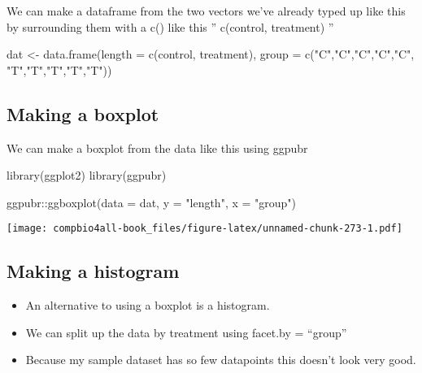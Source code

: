 \documentclass[
]{book}
\newenvironment{Shaded}{\begin{snugshade}}{\end{snugshade}}
\newcommand{\AttributeTok}[1]{\textcolor[rgb]{0.77,0.63,0.00}{#1}}
\newcommand{\FunctionTok}[1]{\textcolor[rgb]{0.00,0.00,0.00}{#1}}
\newcommand{\NormalTok}[1]{#1}
\newcommand{\OtherTok}[1]{\textcolor[rgb]{0.56,0.35,0.01}{#1}}
\newcommand{\SpecialCharTok}[1]{\textcolor[rgb]{0.00,0.00,0.00}{#1}}
\newcommand{\StringTok}[1]{\textcolor[rgb]{0.31,0.60,0.02}{#1}}
\providecommand{\tightlist}{%
  \setlength{\itemsep}{0pt}\setlength{\parskip}{0pt}}
\begin{document}
We can make a dataframe from the two vectors we've already typed up like this by surrounding them with a c() like this '' c(control, treatment) ''

\begin{Shaded}
\begin{Highlighting}[]
\NormalTok{dat }\OtherTok{\textless{}{-}} \FunctionTok{data.frame}\NormalTok{(}\AttributeTok{length =} \FunctionTok{c}\NormalTok{(control, }
\NormalTok{                             treatment),}
                  \AttributeTok{group =} \FunctionTok{c}\NormalTok{(}\StringTok{"C"}\NormalTok{,}\StringTok{"C"}\NormalTok{,}\StringTok{"C"}\NormalTok{,}\StringTok{"C"}\NormalTok{,}\StringTok{"C"}\NormalTok{,}
                            \StringTok{"T"}\NormalTok{,}\StringTok{"T"}\NormalTok{,}\StringTok{"T"}\NormalTok{,}\StringTok{"T"}\NormalTok{,}\StringTok{"T"}\NormalTok{))}
\end{Highlighting}
\end{Shaded}

\hypertarget{making-a-boxplot}{%
\subsection{Making a boxplot}\label{making-a-boxplot}}

We can make a boxplot from the data like this using ggpubr

\begin{Shaded}
\begin{Highlighting}[]
\FunctionTok{library}\NormalTok{(ggplot2)}
\FunctionTok{library}\NormalTok{(ggpubr)}

\NormalTok{ggpubr}\SpecialCharTok{::}\FunctionTok{ggboxplot}\NormalTok{(}\AttributeTok{data =}\NormalTok{ dat,}
          \AttributeTok{y =} \StringTok{"length"}\NormalTok{,}
          \AttributeTok{x =} \StringTok{"group"}\NormalTok{)}
\end{Highlighting}
\end{Shaded}

\texttt{[image: compbio4all-book\_files/figure-latex/unnamed-chunk-273-1.pdf]}

\hypertarget{making-a-histogram}{%
\subsection{Making a histogram}\label{making-a-histogram}}

\begin{itemize}
\tightlist
\item
  An alternative to using a boxplot is a histogram.
\item
  We can split up the data by treatment using facet.by = ``group''
\item
  Because my sample dataset has so few datapoints this doesn't look very good.
\end{itemize}
\end{document}
